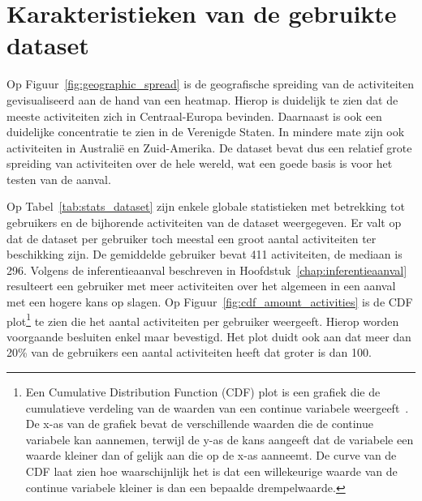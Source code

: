\section{Karakteristieken van de gebruikte dataset}
Op Figuur~\ref{fig:geographic_spread} is de geografische spreiding van de
activiteiten gevisualiseerd aan de hand van een heatmap. Hierop is duidelijk te
zien dat de meeste activiteiten zich in Centraal-Europa bevinden. Daarnaast is
ook een duidelijke concentratie te zien in de Verenigde Staten. In mindere mate
zijn ook activiteiten in Australië en Zuid-Amerika. De dataset bevat dus een
relatief grote spreiding van activiteiten over de hele wereld, wat een goede
basis is voor het testen van de aanval.

Op Tabel~\ref{tab:stats_dataset} zijn enkele globale statistieken met
betrekking tot gebruikers en de bijhorende activiteiten van de dataset
weergegeven. Er valt op dat de dataset per gebruiker toch meestal een groot
aantal activiteiten ter beschikking zijn. De gemiddelde gebruiker bevat 411
activiteiten, de mediaan is 296. Volgens de inferentieaanval beschreven in
Hoofdstuk~\ref{chap:inferentieaanval} resulteert een gebruiker met meer
activiteiten over het algemeen in een aanval met een hogere kans op slagen. Op
Figuur~\ref{fig:cdf_amount_activities} is de \ac{CDF} plot\footnote{Een
    Cumulative Distribution Function (CDF) plot is een grafiek die de cumulatieve
    verdeling van de waarden van een continue variabele
    weergeeft~\cite{CursusSt38:online}. De x-as van de grafiek bevat de
    verschillende waarden die de continue variabele kan aannemen, terwijl de y-as
    de kans aangeeft dat de variabele een waarde kleiner dan of gelijk aan die op
    de x-as aanneemt. De curve van de CDF laat zien hoe waarschijnlijk het is dat
    een willekeurige waarde van de continue variabele kleiner is dan een bepaalde
    drempelwaarde.} te zien die het aantal activiteiten per gebruiker weergeeft.
Hierop worden voorgaande besluiten enkel maar bevestigd. Het plot duidt ook aan
dat meer dan 20\% van de gebruikers een aantal activiteiten heeft dat groter is
dan 100.

